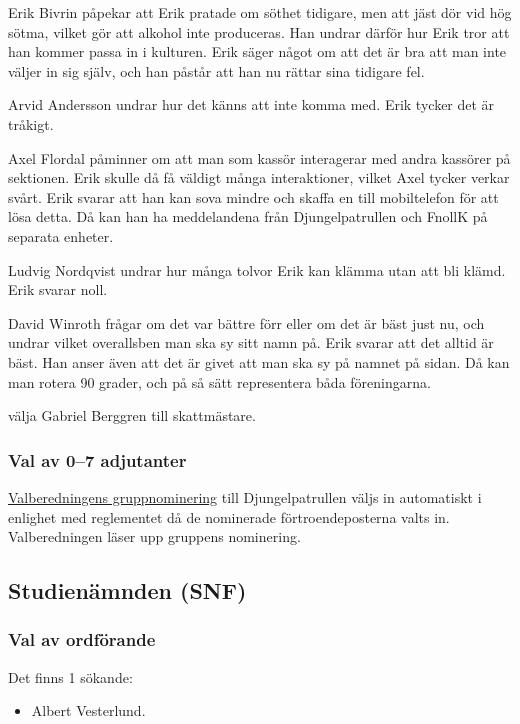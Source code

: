 \documentclass[hidelinks]{sektionsmote}
\begin{document}
Erik Bivrin påpekar att Erik pratade om söthet tidigare, men att jäst dör vid hög sötma, vilket gör att alkohol inte produceras.
Han undrar därför hur Erik tror att han kommer passa in i kulturen.
Erik säger något om att det är bra att man inte väljer in sig själv, och han påstår att han nu rättar sina tidigare fel.

Arvid Andersson undrar hur det känns att inte komma med.
Erik tycker det är tråkigt.

Axel Flordal påminner om att man som kassör interagerar med andra kassörer på sektionen.
Erik skulle då få väldigt många interaktioner, vilket Axel tycker verkar svårt.
Erik svarar att han kan sova mindre och skaffa en till mobiltelefon för att lösa detta.
Då kan han ha meddelandena från Djungelpatrullen och FnollK på separata enheter.

Ludvig Nordqvist undrar hur många tolvor Erik kan klämma utan att bli klämd.
Erik svarar noll.

David Winroth frågar om det var bättre förr eller om det är bäst just nu, och undrar vilket overallsben man ska sy sitt namn på.
Erik svarar att det alltid är bäst.
Han anser även att det är givet att man ska sy på namnet på sidan.
Då kan man rotera 90 grader, och på så sätt representera båda föreningarna.

\begin{beslut}
  \item välja Gabriel Berggren till skattmästare.
\end{beslut}

\subsubsection{Val av 0--7 adjutanter}
\hyperlink{bilagor/nom/dp.pdf.1}{Valberedningens gruppnominering} till Djungelpatrullen väljs in automatiskt i enlighet med reglementet då de nominerade förtroendeposterna valts in.
Valberedningen läser upp gruppens nominering.

\subsection{Studienämnden (SNF)}

\subsubsection{Val av ordförande}
Det finns 1 sökande:
\begin{itemize}
    \item Albert Vesterlund.
\end{itemize}
\end{document}
